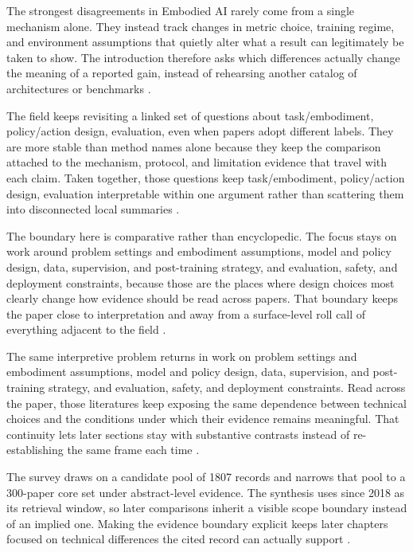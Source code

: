 \documentclass[a4paper,11pt]{article}
\begin{document}
The strongest disagreements in Embodied AI rarely come from a single mechanism alone. They instead track changes in metric choice, training regime, and environment assumptions that quietly alter what a result can legitimately be taken to show. The introduction therefore asks which differences actually change the meaning of a reported gain, instead of rehearsing another catalog of architectures or benchmarks \citep{Zhu2025Objectvla,Doshi2024Scaling,Bu2025Univla,Bai2025Towards,Zhou2025Autoeval,Dai2026Conla}.

The field keeps revisiting a linked set of questions about task/embodiment, policy/action design, evaluation, even when papers adopt different labels. They are more stable than method names alone because they keep the comparison attached to the mechanism, protocol, and limitation evidence that travel with each claim. Taken together, those questions keep task/embodiment, policy/action design, evaluation interpretable within one argument rather than scattering them into disconnected local summaries \citep{Jiang2025Behavior,Eze2024Learning,Kachaev2025Mind,Xu2025Aerial,Wu2024Discrete,Lin2025Echovla}.

The boundary here is comparative rather than encyclopedic. The focus stays on work around problem settings and embodiment assumptions, model and policy design, data, supervision, and post-training strategy, and evaluation, safety, and deployment constraints, because those are the places where design choices most clearly change how evidence should be read across papers. That boundary keeps the paper close to interpretation and away from a surface-level roll call of everything adjacent to the field \citep{Shi2025Diversity,Mandi2022Cacti,Wu2025Moto,Awais2023Foundational,Bai2025Embodied,Black2024Vision}.

The same interpretive problem returns in work on problem settings and embodiment assumptions, model and policy design, data, supervision, and post-training strategy, and evaluation, safety, and deployment constraints. Read across the paper, those literatures keep exposing the same dependence between technical choices and the conditions under which their evidence remains meaningful. That continuity lets later sections stay with substantive contrasts instead of re-establishing the same frame each time \citep{Brohan2023Vision,Bucker2024Grappa,Chen2021Learning,Chen2025Internvla,Chen2025Once,Cui2025Openhelix}.

The survey draws on a candidate pool of 1807 records and narrows that pool to a 300-paper core set under abstract-level evidence. The synthesis uses since 2018 as its retrieval window, so later comparisons inherit a visible scope boundary instead of an implied one. Making the evidence boundary explicit keeps later chapters focused on technical differences the cited record can actually support \citep{Dai2025Manitaskgen,Dong2026Capturing,Duggan2026Price,Fang2025From,Gu2025Safe,Hou2025Dita}.
\end{document}
